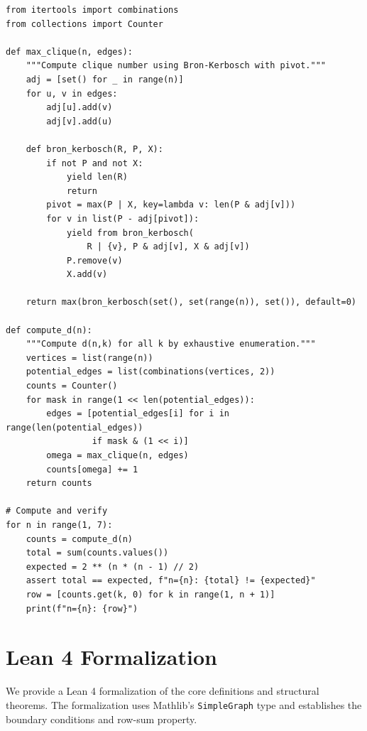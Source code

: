 \documentclass[11pt,a4paper]{article}
\theoremstyle{definition}
\begin{document}
\begin{verbatim}
from itertools import combinations
from collections import Counter

def max_clique(n, edges):
    """Compute clique number using Bron-Kerbosch with pivot."""
    adj = [set() for _ in range(n)]
    for u, v in edges:
        adj[u].add(v)
        adj[v].add(u)

    def bron_kerbosch(R, P, X):
        if not P and not X:
            yield len(R)
            return
        pivot = max(P | X, key=lambda v: len(P & adj[v]))
        for v in list(P - adj[pivot]):
            yield from bron_kerbosch(
                R | {v}, P & adj[v], X & adj[v])
            P.remove(v)
            X.add(v)

    return max(bron_kerbosch(set(), set(range(n)), set()), default=0)

def compute_d(n):
    """Compute d(n,k) for all k by exhaustive enumeration."""
    vertices = list(range(n))
    potential_edges = list(combinations(vertices, 2))
    counts = Counter()
    for mask in range(1 << len(potential_edges)):
        edges = [potential_edges[i] for i in range(len(potential_edges))
                 if mask & (1 << i)]
        omega = max_clique(n, edges)
        counts[omega] += 1
    return counts

# Compute and verify
for n in range(1, 7):
    counts = compute_d(n)
    total = sum(counts.values())
    expected = 2 ** (n * (n - 1) // 2)
    assert total == expected, f"n={n}: {total} != {expected}"
    row = [counts.get(k, 0) for k in range(1, n + 1)]
    print(f"n={n}: {row}")
\end{verbatim}

\section{Lean 4 Formalization}

We provide a Lean 4 formalization of the core definitions and structural theorems. The formalization uses Mathlib's \texttt{SimpleGraph} type and establishes the boundary conditions and row-sum property.
\end{document}
